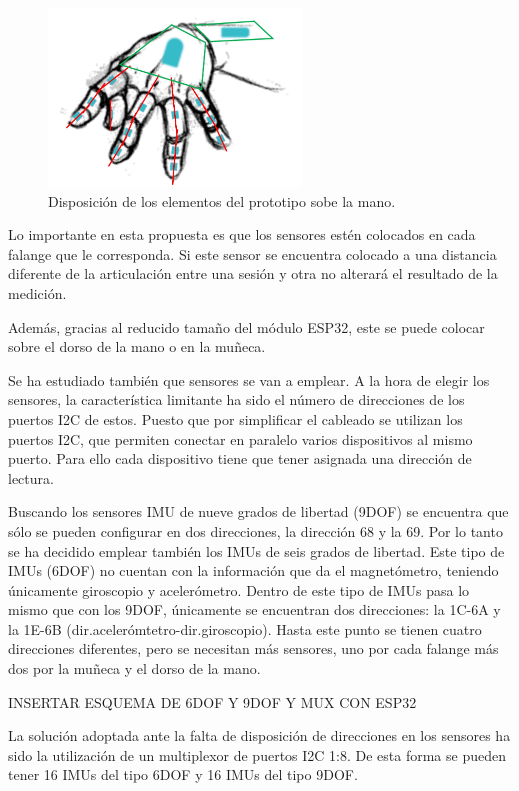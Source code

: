 \begin{figure}[H]
	\centering
	\includegraphics[width=0.6\textwidth]{./img/IMU2}
	\caption{Disposición de los elementos del prototipo sobe la mano. } 
	\label{fig:disposicionIMU}
\end{figure} 

Lo importante en esta propuesta es que los sensores estén colocados en cada falange que le corresponda. Si este sensor se encuentra colocado a una distancia diferente de la articulación entre una sesión y otra no alterará el resultado de la medición.

Además, gracias al reducido tamaño del módulo ESP32, este se puede colocar sobre el dorso de la mano o en la muñeca. 

Se ha estudiado también que sensores se van a emplear. A la hora de elegir los sensores, la característica limitante ha sido el número de direcciones de los puertos I2C de estos. Puesto que por simplificar el cableado se utilizan los puertos I2C, que permiten conectar en paralelo varios dispositivos al mismo puerto. Para ello cada dispositivo tiene que tener asignada una dirección de lectura. 

Buscando los sensores IMU de nueve grados de libertad (9DOF) se encuentra que sólo se pueden configurar en dos direcciones, la dirección 68 y la 69. Por lo tanto se ha decidido emplear también los IMUs de seis grados de libertad. Este tipo de IMUs (6DOF) no cuentan con la información que da el magnetómetro, teniendo únicamente giroscopio y acelerómetro. Dentro de este tipo de IMUs pasa lo mismo que con los 9DOF, únicamente se encuentran dos direcciones: la 1C-6A y la 1E-6B (dir.acelerómtetro-dir.giroscopio). Hasta este punto se tienen cuatro direcciones diferentes, pero se necesitan más sensores, uno por cada falange más dos por la muñeca y el dorso de la mano. 

\textcolor{rositaoscuro}{INSERTAR ESQUEMA DE 6DOF Y 9DOF Y MUX CON ESP32}

La solución adoptada ante la falta de disposición de direcciones en los sensores ha sido la utilización de un multiplexor de puertos I2C 1:8. De esta forma se pueden tener 16 IMUs del tipo 6DOF y 16 IMUs del tipo 9DOF.

